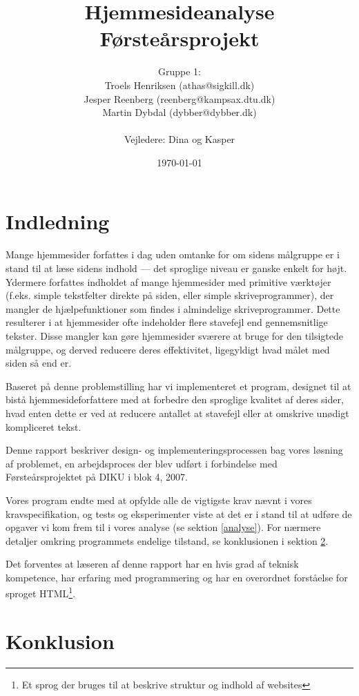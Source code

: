 \documentclass[a4paper,oneside,article]{memoir}
\title{Hjemmesideanalyse  \\ \small{Førsteårsprojekt}}
\author
{
  Gruppe 1:\\
  Troels Henriksen (athas@sigkill.dk)\\
  Jesper Reenberg (reenberg@kampsax.dtu.dk)\\
  Martin Dybdal (dybber@dybber.dk)\\ \\
  Vejledere: Dina og Kasper
}
\date{\today}
\begin{document}
\maketitle
\newpage
\tableofcontents*
\newpage


\newpage
\chapter{Indledning}
\label{indledning}
Mange hjemmesider forfattes i dag uden omtanke for om sidens målgruppe
er i stand til at læse sidens indhold --- det sproglige niveau er
ganske enkelt for højt. Ydermere forfattes indholdet af mange
hjemmesider med primitive værktøjer (f.eks. simple tekstfelter direkte
på siden, eller simple skriveprogrammer), der mangler de
hjælpefunktioner som findes i almindelige skriveprogrammer. Dette
resulterer i at hjemmesider ofte indeholder flere stavefejl end
gennemsnitlige tekster. Disse mangler kan gøre hjemmesider sværere at
bruge for den tilsigtede målgruppe, og derved reducere deres
effektivitet, ligegyldigt hvad målet med siden så end er.

Baseret på denne problemstilling har vi implementeret et program,
designet til at bistå hjemmesideforfattere med at forbedre den
sproglige kvalitet af deres sider, hvad enten dette er ved at reducere
antallet at stavefejl eller at omskrive unødigt kompliceret tekst.

Denne rapport beskriver design- og implementeringsprocessen bag vores
løsning af problemet, en arbejdsproces der blev udført i forbindelse
med Førsteårsprojektet på DIKU i blok 4, 2007.

Vores program endte med at opfylde alle de vigtigste krav nævnt i
vores kravspecifikation, og tests og eksperimenter viste at det er i
stand til at udføre de opgaver vi kom frem til i vores analyse (se
sektion \ref{analyse}). For nærmere detaljer omkring programmets
endelige tilstand, se konklusionen i sektion \ref{konklusion}.

Det forventes at læseren af denne rapport har en hvis grad af teknisk
kompetence, har erfaring med programmering og har en overordnet
forståelse for sproget HTML\footnote{Et sprog der bruges til at
  beskrive struktur og indhold af websites}.

\newpage
\chapter{Konklusion}
\label{konklusion}
\end{document}
